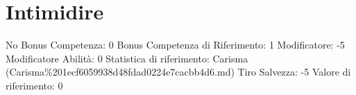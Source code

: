 \section{Intimidire}\label{intimidire}

\begin{description}
\tightlist
\item[Tags: ABI]
No Bonus Competenza: 0 Bonus Competenza di Riferimento: 1 Modificatore:
-5 Modificatore Abilità: 0 Statistica di riferimento: Carisma
(Carisma\%201ecf6059938d48fdad0224e7cacbb4d6.md) Tiro Salvezza: -5
Valore di riferimento: 0
\end{description}
